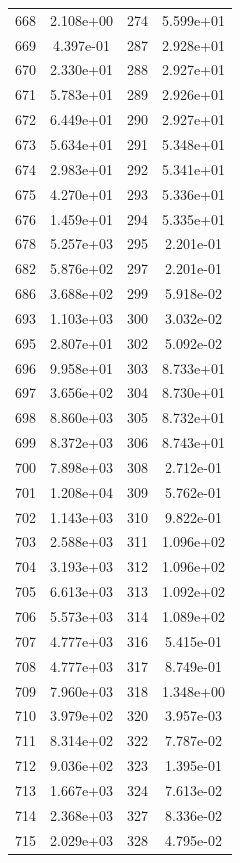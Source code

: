 \documentclass[12pt]{article}
\begin{document}
\begin{longtable}{@{}cccc@{}}
668 & 2.108e+00 & 274 & 5.599e+01 \\
669 & 4.397e-01 & 287 & 2.928e+01 \\
670 & 2.330e+01 & 288 & 2.927e+01 \\
671 & 5.783e+01 & 289 & 2.926e+01 \\
672 & 6.449e+01 & 290 & 2.927e+01 \\
673 & 5.634e+01 & 291 & 5.348e+01 \\
674 & 2.983e+01 & 292 & 5.341e+01 \\
675 & 4.270e+01 & 293 & 5.336e+01 \\
676 & 1.459e+01 & 294 & 5.335e+01 \\
678 & 5.257e+03 & 295 & 2.201e-01 \\
682 & 5.876e+02 & 297 & 2.201e-01 \\
686 & 3.688e+02 & 299 & 5.918e-02 \\
693 & 1.103e+03 & 300 & 3.032e-02 \\
695 & 2.807e+01 & 302 & 5.092e-02 \\
696 & 9.958e+01 & 303 & 8.733e+01 \\
697 & 3.656e+02 & 304 & 8.730e+01 \\
698 & 8.860e+03 & 305 & 8.732e+01 \\
699 & 8.372e+03 & 306 & 8.743e+01 \\
700 & 7.898e+03 & 308 & 2.712e-01 \\
701 & 1.208e+04 & 309 & 5.762e-01 \\
702 & 1.143e+03 & 310 & 9.822e-01 \\
703 & 2.588e+03 & 311 & 1.096e+02 \\
704 & 3.193e+03 & 312 & 1.096e+02 \\
705 & 6.613e+03 & 313 & 1.092e+02 \\
706 & 5.573e+03 & 314 & 1.089e+02 \\
707 & 4.777e+03 & 316 & 5.415e-01 \\
708 & 4.777e+03 & 317 & 8.749e-01 \\
709 & 7.960e+03 & 318 & 1.348e+00 \\
710 & 3.979e+02 & 320 & 3.957e-03 \\
711 & 8.314e+02 & 322 & 7.787e-02 \\
712 & 9.036e+02 & 323 & 1.395e-01 \\
713 & 1.667e+03 & 324 & 7.613e-02 \\
714 & 2.368e+03 & 327 & 8.336e-02 \\
715 & 2.029e+03 & 328 & 4.795e-02 \\

\end{longtable}
\end{document}
